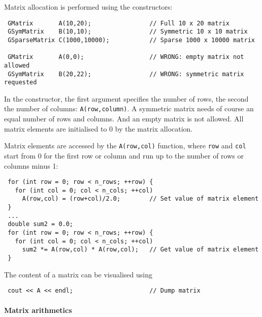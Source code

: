 \documentclass{article}[12pt,a4]
\begin{document}
Matrix allocation is performed using the constructors:
\begin{verbatim}
 GMatrix       A(10,20);                // Full 10 x 20 matrix
 GSymMatrix    B(10,10);                // Symmetric 10 x 10 matrix
 GSparseMatrix C(1000,10000);           // Sparse 1000 x 10000 matrix

 GMatrix       A(0,0);                  // WRONG: empty matrix not allowed
 GSymMatrix    B(20,22);                // WRONG: symmetric matrix requested
\end{verbatim}
In the constructor, the first argument specifies the number of rows, 
the second the number of columns: {\tt A(row,column)}.
A symmetric matrix needs of course an equal number of rows and columns.
And an empty matrix is not allowed.
All matrix elements are initialised to 0 by the matrix allocation.

Matrix elements are accessed by the {\tt A(row,col)} function,
where {\tt row} and {\tt col} start from 0 for the first row or column 
and run up to the number of rows or columns minus 1:
\begin{verbatim}
 for (int row = 0; row < n_rows; ++row) {
   for (int col = 0; col < n_cols; ++col)
     A(row,col) = (row+col)/2.0;        // Set value of matrix element
 }
 ...
 double sum2 = 0.0;
 for (int row = 0; row < n_rows; ++row) {
   for (int col = 0; col < n_cols; ++col)
     sum2 *= A(row,col) * A(row,col);   // Get value of matrix element
 }
\end{verbatim}

The content of a matrix can be visualised using
\begin{verbatim}
 cout << A << endl;                     // Dump matrix
\end{verbatim}


\paragraph{Matrix arithmetics}
\end{document}
